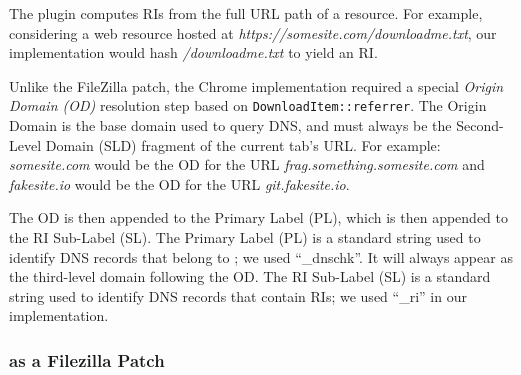The plugin computes RIs from the full URL path of a resource. For example,
considering a web resource hosted at
\textit{https://somesite.com/downloadme.txt}, our implementation would hash
\textit{/downloadme.txt} to yield an RI.

Unlike the FileZilla patch, the Chrome implementation required a special
\emph{Origin Domain (OD)} resolution step based on
\texttt{DownloadItem::referrer}. The Origin Domain is the base domain used to
query DNS, and must always be the Second-Level Domain (SLD) fragment of the
current tab's URL. For example: \emph{somesite.com} would be the OD for the URL
\emph{frag.something.somesite.com} and \emph{fakesite.io} would be the OD for
the URL \emph{git.fakesite.io}.

The OD is then appended to the Primary Label (PL), which is then appended to
the RI Sub-Label (SL). The Primary Label (PL) is a standard string used to
identify DNS records that belong to \SYSTEM{}; we used ``\_dnschk''. It will
always appear as the third-level domain following the OD. The RI Sub-Label (SL)
is a standard string used to identify DNS records that contain RIs; we used
``\_ri'' in our implementation.


\subsubsection{\SYSTEM{} as a Filezilla Patch}

